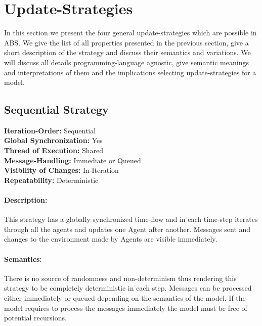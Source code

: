 \section{Update-Strategies}
In this section we present the four general update-strategies which are possible in ABS. We give the list of all properties presented in the previous section, give a short description of the strategy and discuss their semantics and variations. We will discuss all details programming-language agnostic, give semantic meanings and interpretations of them and the implications selecting update-strategies for a model.

\subsection{Sequential Strategy}
\textbf{Iteration-Order:} Sequential \\
\textbf{Global Synchronization:} Yes \\
\textbf{Thread of Execution:} Shared \\
\textbf{Message-Handling:} Immediate or Queued \\
\textbf{Visibility of Changes:}	In-Iteration \\
\textbf{Repeatability:}	Deterministic 
	
\paragraph{Description:} This strategy has a globally synchronized time-flow and in each time-step iterates through all the agents and updates one Agent after another. Messages sent and changes to the environment made by Agents are visible immediately. 

\paragraph{Semantics:} There is no source of randomness and non-determinism thus rendering this strategy to be completely deterministic in each step. Messages can be processed either immediately or queued depending on the semantics of the model. If the model requires to process the messages immediately the model must be free of potential recursions.

